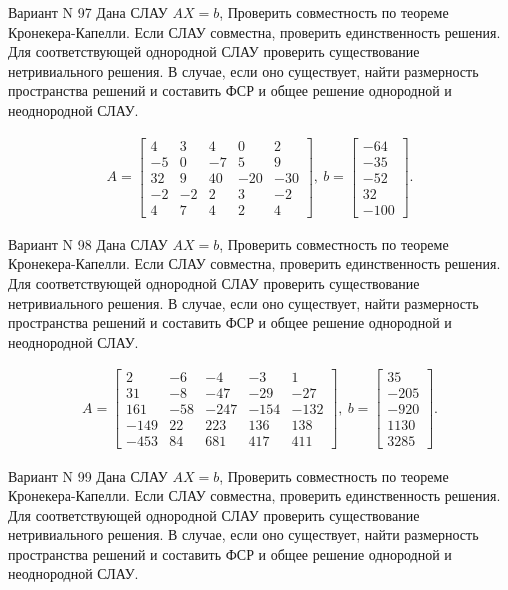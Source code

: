 \documentclass[11pt]{report}
\begin{document}
Вариант N 97
Дана СЛАУ $AX = b$,
Проверить совместность по теореме Кронекера-Капелли. Если СЛАУ совместна, проверить единственность решения.
Для соответствующей однородной СЛАУ проверить существование нетривиального решения. В случае, если оно существует,
найти размерность пространства решений и составить ФСР и общее решение однородной  и неоднородной СЛАУ.


\begin{align*}
 A = \left[\begin{matrix}4 & 3 & 4 & 0 & 2\\-5 & 0 & -7 & 5 & 9\\32 & 9 & 40 & -20 & -30\\-2 & -2 & 2 & 3 & -2\\4 & 7 & 4 & 2 & 4\end{matrix}\right],
\ b = \left[\begin{matrix}-64\\-35\\-52\\32\\-100\end{matrix}\right]. 
 \end{align*}

Вариант N 98
Дана СЛАУ $AX = b$,
Проверить совместность по теореме Кронекера-Капелли. Если СЛАУ совместна, проверить единственность решения.
Для соответствующей однородной СЛАУ проверить существование нетривиального решения. В случае, если оно существует,
найти размерность пространства решений и составить ФСР и общее решение однородной  и неоднородной СЛАУ.


\begin{align*}
 A = \left[\begin{matrix}2 & -6 & -4 & -3 & 1\\31 & -8 & -47 & -29 & -27\\161 & -58 & -247 & -154 & -132\\-149 & 22 & 223 & 136 & 138\\-453 & 84 & 681 & 417 & 411\end{matrix}\right],
\ b = \left[\begin{matrix}35\\-205\\-920\\1130\\3285\end{matrix}\right]. 
 \end{align*}

Вариант N 99
Дана СЛАУ $AX = b$,
Проверить совместность по теореме Кронекера-Капелли. Если СЛАУ совместна, проверить единственность решения.
Для соответствующей однородной СЛАУ проверить существование нетривиального решения. В случае, если оно существует,
найти размерность пространства решений и составить ФСР и общее решение однородной  и неоднородной СЛАУ.
\end{document}
